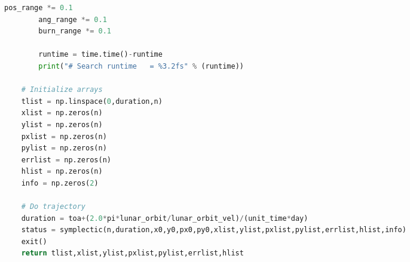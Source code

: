 \begin{adjustwidth*}{0cm}{-0.4cm}
\begin{lstlisting}[language=Python]
        pos_range *= 0.1
        ang_range *= 0.1
        burn_range *= 0.1

        runtime = time.time()-runtime
        print("# Search runtime   = %3.2fs" % (runtime))

    # Initialize arrays
    tlist = np.linspace(0,duration,n)
    xlist = np.zeros(n)
    ylist = np.zeros(n)
    pxlist = np.zeros(n)
    pylist = np.zeros(n)
    errlist = np.zeros(n)
    hlist = np.zeros(n)
    info = np.zeros(2)

    # Do trajectory
    duration = toa+(2.0*pi*lunar_orbit/lunar_orbit_vel)/(unit_time*day)
    status = symplectic(n,duration,x0,y0,px0,py0,xlist,ylist,pxlist,pylist,errlist,hlist,info)
    exit()
    return tlist,xlist,ylist,pxlist,pylist,errlist,hlist
\end{lstlisting}
\end{adjustwidth*}

